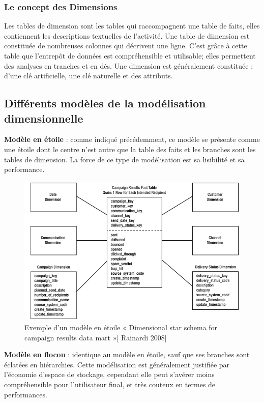  \subsubsection{Le concept des Dimensions}
 
  Les tables de dimension sont les tables qui raccompagnent une table de faits, elles contiennent les descriptions textuelles de l'activité. Une table de dimension est constituée de nombreuses colonnes qui décrivent une ligne. C'est grâce à cette table que l'entrepôt de données est compréhensible et utilisable; elles permettent des analyses en tranches et en dés. Une dimension est généralement constituée : d'une clé artificielle, une clé naturelle et des attributs.
  
 \subsection{Différents modèles de la modélisation dimensionnelle}
  
  \textbf{Modèle en étoile} : comme indiqué précédemment, ce modèle se présente comme une étoile dont le centre n’est autre que la table des faits et les branches sont les tables de dimension. La force de ce type de modélisation est sa lisibilité et sa performance. 
  
  \begin{figure}[h]
	\begin{center}
		\includegraphics[scale=0.85]{images/etoile.png}
		\caption{Exemple d'un modèle en étoile « Dimensional star schema for campaign results data mart »[ Rainardi 2008]}
		\label{model-en-etoile}
	\end{center}
\end{figure}
\textbf{Modèle en flocon} : identique au modèle en étoile, sauf que ses branches sont éclatées en hiérarchies. Cette modélisation est généralement justifiée par l'économie d'espace de stockage, cependant elle peut s’avérer moins compréhensible pour l'utilisateur final, et très couteux en termes de performances.

